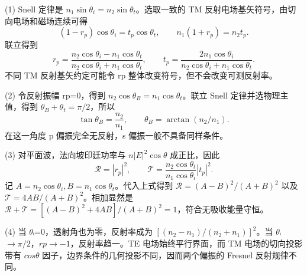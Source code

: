 (1) Snell 定律是 \(n_1\sin\theta_i=n_2\sin\theta_t\)。选取一致的 TM 反射电场基矢符号，由切向电场和磁场连续可得
\[
(1-r_p)\cos\theta_i=t_p\cos\theta_t,\qquad
n_1(1+r_p)=n_2t_p .
\]
联立得到
\[
r_p=\frac{n_2\cos\theta_i-n_1\cos\theta_t}
{n_2\cos\theta_i+n_1\cos\theta_t},\qquad
t_p=\frac{2n_1\cos\theta_i}
{n_2\cos\theta_i+n_1\cos\theta_t}.
\]
不同 TM 反射基矢约定可能令 rp 整体改变符号，但不会改变可测反射率。

(2) 令反射振幅 rp=0，得到 \(n_2\cos\theta_B=n_1\cos\theta_t\)。联立 Snell 定律并选物理主值，得到 \(\theta_B+\theta_t=\pi/2\)，所以
\[
\tan\theta_B=\frac{n_2}{n_1},\qquad \theta_B=\arctan(n_2/n_1).
\]
在这一角度 p 偏振完全无反射，s 偏振一般不具备同样条件。

(3) 对平面波，法向坡印廷功率与 \(n|E|^2\cos\theta\) 成正比，因此
\[
\mathcal R=|r_p|^2,\qquad
\mathcal T=\frac{n_2\cos\theta_t}{n_1\cos\theta_i}|t_p|^2.
\]
记 \(A=n_2\cos\theta_i,B=n_1\cos\theta_t\)。代入上式得到 \(\mathcal R=(A-B)^2/(A+B)^2\) 以及 \(\mathcal T=4AB/(A+B)^2\)。相加显然是 \(\mathcal R+\mathcal T=[(A-B)^2+4AB]/(A+B)^2=1\)，符合无吸收能量守恒。

(4) 当 \(\theta \)ᵢ=0，透射角也为零，反射率成为 \([(n_2-n_1)/(n_2+n_1)]^2\)。当 \(\theta \)ᵢ\(\to \pi /2\)，\(rp\to -1\)，反射率趋一。TE 电场始终平行界面，而 TM 电场的切向投影带有 \(cos\theta \) 因子，边界条件的几何投影不同，因而两个偏振的 Fresnel 反射规律不同。
